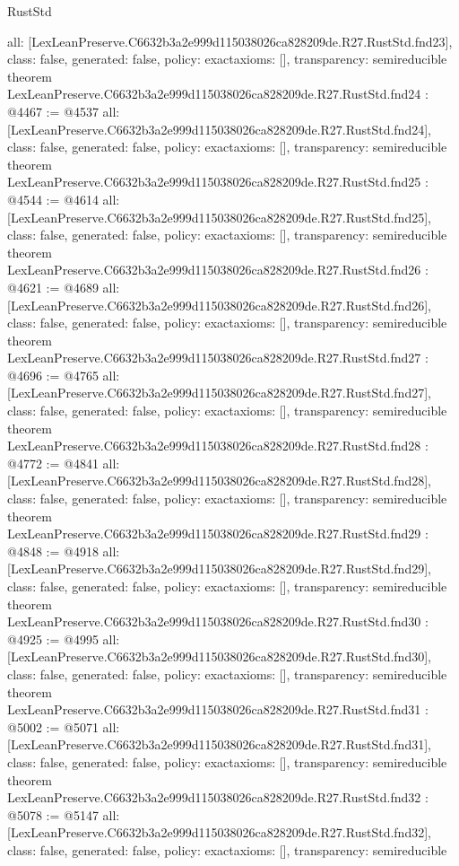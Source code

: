 \begin{lexlean}{RustStd}
\begin{coremodule}
{  all: [LexLeanPreserve.C6632b3a2e999d115038026ca828209de.R27.RustStd.fnd23],
  class: false,
  generated: false,
  policy: exact{axioms: []},
  transparency: semireducible
}
theorem LexLeanPreserve.C6632b3a2e999d115038026ca828209de.R27.RustStd.fnd24 : @4467 := @4537 {
  all: [LexLeanPreserve.C6632b3a2e999d115038026ca828209de.R27.RustStd.fnd24],
  class: false,
  generated: false,
  policy: exact{axioms: []},
  transparency: semireducible
}
theorem LexLeanPreserve.C6632b3a2e999d115038026ca828209de.R27.RustStd.fnd25 : @4544 := @4614 {
  all: [LexLeanPreserve.C6632b3a2e999d115038026ca828209de.R27.RustStd.fnd25],
  class: false,
  generated: false,
  policy: exact{axioms: []},
  transparency: semireducible
}
theorem LexLeanPreserve.C6632b3a2e999d115038026ca828209de.R27.RustStd.fnd26 : @4621 := @4689 {
  all: [LexLeanPreserve.C6632b3a2e999d115038026ca828209de.R27.RustStd.fnd26],
  class: false,
  generated: false,
  policy: exact{axioms: []},
  transparency: semireducible
}
theorem LexLeanPreserve.C6632b3a2e999d115038026ca828209de.R27.RustStd.fnd27 : @4696 := @4765 {
  all: [LexLeanPreserve.C6632b3a2e999d115038026ca828209de.R27.RustStd.fnd27],
  class: false,
  generated: false,
  policy: exact{axioms: []},
  transparency: semireducible
}
theorem LexLeanPreserve.C6632b3a2e999d115038026ca828209de.R27.RustStd.fnd28 : @4772 := @4841 {
  all: [LexLeanPreserve.C6632b3a2e999d115038026ca828209de.R27.RustStd.fnd28],
  class: false,
  generated: false,
  policy: exact{axioms: []},
  transparency: semireducible
}
theorem LexLeanPreserve.C6632b3a2e999d115038026ca828209de.R27.RustStd.fnd29 : @4848 := @4918 {
  all: [LexLeanPreserve.C6632b3a2e999d115038026ca828209de.R27.RustStd.fnd29],
  class: false,
  generated: false,
  policy: exact{axioms: []},
  transparency: semireducible
}
theorem LexLeanPreserve.C6632b3a2e999d115038026ca828209de.R27.RustStd.fnd30 : @4925 := @4995 {
  all: [LexLeanPreserve.C6632b3a2e999d115038026ca828209de.R27.RustStd.fnd30],
  class: false,
  generated: false,
  policy: exact{axioms: []},
  transparency: semireducible
}
theorem LexLeanPreserve.C6632b3a2e999d115038026ca828209de.R27.RustStd.fnd31 : @5002 := @5071 {
  all: [LexLeanPreserve.C6632b3a2e999d115038026ca828209de.R27.RustStd.fnd31],
  class: false,
  generated: false,
  policy: exact{axioms: []},
  transparency: semireducible
}
theorem LexLeanPreserve.C6632b3a2e999d115038026ca828209de.R27.RustStd.fnd32 : @5078 := @5147 {
  all: [LexLeanPreserve.C6632b3a2e999d115038026ca828209de.R27.RustStd.fnd32],
  class: false,
  generated: false,
  policy: exact{axioms: []},
  transparency: semireducible
}
\end{coremodule}
\end{lexlean}
